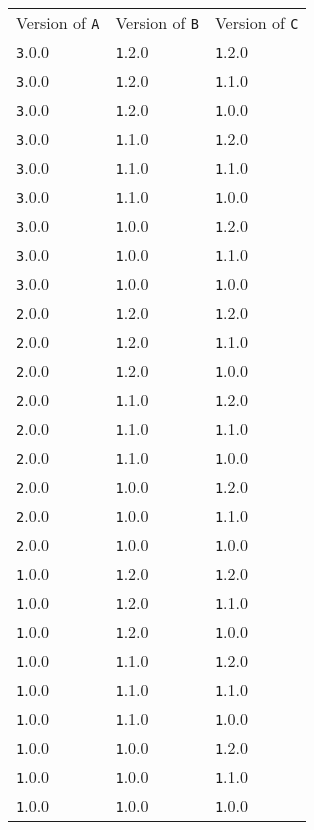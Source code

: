 \documentclass[11pt,a4paper,twocolumn]{article}
\newcommand{\code}[1]{\texttt{#1}} %
\begin{document}
\begin{tabular}{ l l l }
  Version of {\code A} & Version of {\code B} & Version of {\code C} \\
  {\code 3.0.0} & {\code 1.2.0} & {\code 1.2.0} \\
  {\code 3.0.0} & {\code 1.2.0} & {\code 1.1.0} \\
  {\code 3.0.0} & {\code 1.2.0} & {\code 1.0.0} \\
  {\code 3.0.0} & {\code 1.1.0} & {\code 1.2.0} \\
  {\code 3.0.0} & {\code 1.1.0} & {\code 1.1.0} \\
  {\code 3.0.0} & {\code 1.1.0} & {\code 1.0.0} \\
  {\code 3.0.0} & {\code 1.0.0} & {\code 1.2.0} \\
  {\code 3.0.0} & {\code 1.0.0} & {\code 1.1.0} \\
  {\code 3.0.0} & {\code 1.0.0} & {\code 1.0.0} \\
  {\code 2.0.0} & {\code 1.2.0} & {\code 1.2.0} \\
  {\code 2.0.0} & {\code 1.2.0} & {\code 1.1.0} \\
  {\code 2.0.0} & {\code 1.2.0} & {\code 1.0.0} \\
  {\code 2.0.0} & {\code 1.1.0} & {\code 1.2.0} \\
  {\code 2.0.0} & {\code 1.1.0} & {\code 1.1.0} \\
  {\code 2.0.0} & {\code 1.1.0} & {\code 1.0.0} \\
  {\code 2.0.0} & {\code 1.0.0} & {\code 1.2.0} \\
  {\code 2.0.0} & {\code 1.0.0} & {\code 1.1.0} \\
  {\code 2.0.0} & {\code 1.0.0} & {\code 1.0.0} \\
  {\code 1.0.0} & {\code 1.2.0} & {\code 1.2.0} \\
  {\code 1.0.0} & {\code 1.2.0} & {\code 1.1.0} \\
  {\code 1.0.0} & {\code 1.2.0} & {\code 1.0.0} \\
  {\code 1.0.0} & {\code 1.1.0} & {\code 1.2.0} \\
  {\code 1.0.0} & {\code 1.1.0} & {\code 1.1.0} \\
  {\code 1.0.0} & {\code 1.1.0} & {\code 1.0.0} \\
  {\code 1.0.0} & {\code 1.0.0} & {\code 1.2.0} \\
  {\code 1.0.0} & {\code 1.0.0} & {\code 1.1.0} \\
  {\code 1.0.0} & {\code 1.0.0} & {\code 1.0.0} \\
\end{tabular}
\end{document}
